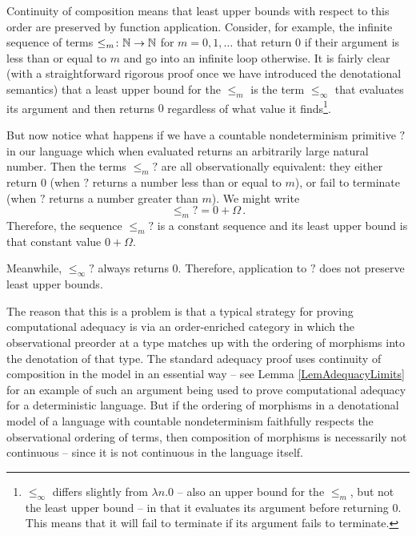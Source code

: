 Continuity of composition means that least upper bounds with respect to this order are preserved by function application.  
Consider, for example, the infinite sequence of terms $\le_m \colon \mathbb{N} \to \mathbb{N}$ for $m=0,1,\dots$ that return $0$ if their argument is less than or equal to $m$ and go into an infinite loop otherwise.
It is fairly clear (with a straightforward rigorous proof once we have introduced the denotational semantics) that a least upper bound for the $\le_m$ is the term $\le_\infty$ that evaluates its argument and then returns $0$ regardless of what value it finds\footnote{$\le_\infty$ differs slightly from $\lambda n.0$ -- also an upper bound for the $\le_m$, but not the least upper bound -- in that it evaluates its argument before returning $0$.  
This means that it will fail to terminate if its argument fails to terminate.}.

But now notice what happens if we have a countable nondeterminism primitive $?$ in our language which when evaluated returns an arbitrarily large natural number.
Then the terms $\le_m ?$ are all observationally equivalent: they either return $0$ (when $?$ returns a number less than or equal to $m$), or fail to terminate (when $?$ returns a number greater than $m$).
We might write
\[
  \le_m ? = 0 + \Omega\,.
  \]
Therefore, the sequence $\le_m?$ is a constant sequence and its least upper bound is that constant value $0+\Omega$.

Meanwhile, $\le_\infty?$ always returns $0$.  
Therefore, application to $?$ does not preserve least upper bounds.

The reason that this is a problem is that a typical strategy for proving computational adequacy is via an order-enriched category in which the observational preorder at a type matches up with the ordering of morphisms into the denotation of that type.  
The standard adequacy proof uses continuity of composition in the model in an essential way -- see Lemma \ref{LemAdequacyLimits} for an example of such an argument being used to prove computational adequacy for a deterministic language.
But if the ordering of morphisms in a denotational model of a language with countable nondeterminism faithfully respects the observational ordering of terms, then composition of morphisms is necessarily not continuous -- since it is not continuous in the language itself.

